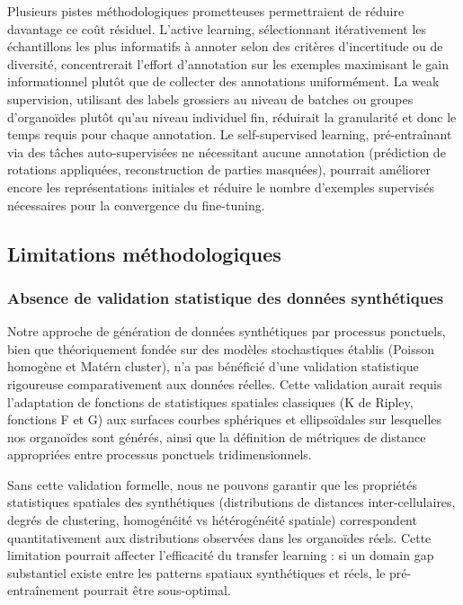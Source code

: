 Plusieurs pistes méthodologiques prometteuses permettraient de réduire davantage ce coût résiduel. L'active learning, sélectionnant itérativement les échantillons les plus informatifs à annoter selon des critères d'incertitude ou de diversité, concentrerait l'effort d'annotation sur les exemples maximisant le gain informationnel plutôt que de collecter des annotations uniformément. La weak supervision, utilisant des labels grossiers au niveau de batches ou groupes d'organoïdes plutôt qu'au niveau individuel fin, réduirait la granularité et donc le temps requis pour chaque annotation. Le self-supervised learning, pré-entraînant via des tâches auto-supervisées ne nécessitant aucune annotation (prédiction de rotations appliquées, reconstruction de parties masquées), pourrait améliorer encore les représentations initiales et réduire le nombre d'exemples supervisés nécessaires pour la convergence du fine-tuning.

\subsection{Limitations méthodologiques}

\subsubsection{Absence de validation statistique des données synthétiques}

Notre approche de génération de données synthétiques par processus ponctuels, bien que théoriquement fondée sur des modèles stochastiques établis (Poisson homogène et Matérn cluster), n'a pas bénéficié d'une validation statistique rigoureuse comparativement aux données réelles. Cette validation aurait requis l'adaptation de fonctions de statistiques spatiales classiques (K de Ripley, fonctions F et G) aux surfaces courbes sphériques et ellipsoïdales sur lesquelles nos organoïdes sont générés, ainsi que la définition de métriques de distance appropriées entre processus ponctuels tridimensionnels.

Sans cette validation formelle, nous ne pouvons garantir que les propriétés statistiques spatiales des synthétiques (distributions de distances inter-cellulaires, degrés de clustering, homogénéité vs hétérogénéité spatiale) correspondent quantitativement aux distributions observées dans les organoïdes réels. Cette limitation pourrait affecter l'efficacité du transfer learning : si un domain gap substantiel existe entre les patterns spatiaux synthétiques et réels, le pré-entraînement pourrait être sous-optimal.

